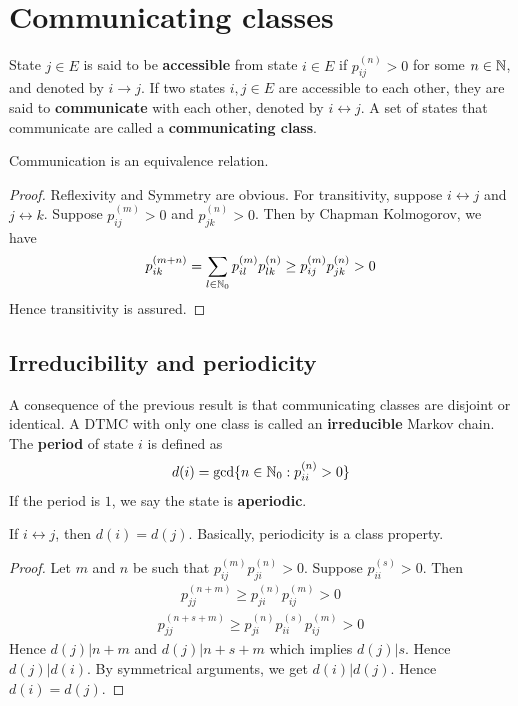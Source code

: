 \documentclass[a4paper,10pt,english]{article}
\begin{document}
\section{Communicating classes}
State $j \in E$ is said to be \textbf{accessible} from state $i \in E$ if $p_{ij}^{(n)} >0$ for some $n \in \mathbb{N}$, and denoted by $i \to j$. 
If two states $i,j \in E$ are accessible to each other, they are said to \textbf{communicate} with each other, denoted by $i \leftrightarrow j$. 
A set of states that communicate are called a \textbf{communicating class}. 

\begin{prop}
Communication is an equivalence relation. 
\end{prop}
\begin{proof}
Reflexivity and Symmetry are obvious. For transitivity, suppose $i \leftrightarrow j$ and $j \leftrightarrow k$. Suppose $p_{ij}^{(m)} >0$ and $p_{jk}^{(n)} >0$. Then by Chapman Kolmogorov, we have
\begin{align*}p_{ik}^{(m+n)} = \sum_{l \in \mathbb{N}_0} p_{il}^{(m)}p_{lk}^{(n)} \geq p_{ij}^{(m)}p_{jk}^{(n)} >0  \end{align*}
Hence transitivity is assured.
\end{proof}

\subsection{Irreducibility and periodicity}
A consequence of the previous result is that communicating classes are disjoint or identical. A DTMC with only one class is called an \textbf{irreducible} Markov chain.
The \textbf{period} of state $i$ is defined as
\begin{align*}d(i) = \gcd\{n \in \mathbb{N}_0 : p_{ii}^{(n)} > 0\}\end{align*}
If the period is $1$, we say the state is \textbf{aperiodic}.

\begin{prop}
If $i \leftrightarrow j$, then $d(i) = d(j)$. Basically, periodicity is a class property.
\end{prop}
\begin{proof}
Let $m$ and $n$ be such that $p_{ij}^{(m)}p_{ji}^{(n)} > 0$. Suppose $p_{ii}^{(s)} > 0$. Then
\begin{align*} p_{jj}^{(n+m)} \geq p_{ji}^{(n)}p_{ij}^{(m)} > 0 \end{align*}
\begin{align*} p_{jj}^{(n+s+m)} \geq p_{ji}^{(n)}p_{ii}^{(s)}p_{ij}^{(m)} > 0 \end{align*}
Hence $d(j) | n+m$ and $d(j) | n+s+m$ which implies $d(j) | s$. Hence $d(j) | d(i)$. By symmetrical arguments, we get $d(i) | d(j)$. Hence $d(i) = d(j)$.
\end{proof}
\end{document}
